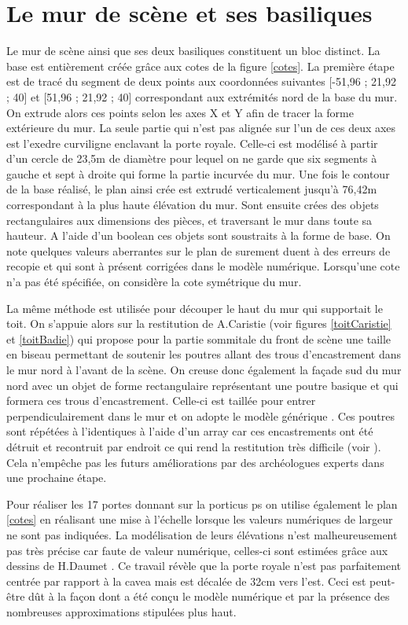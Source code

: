 		\section{Le mur de scène et ses basiliques}

Le mur de scène ainsi que ses deux basiliques constituent un bloc distinct. La base est entièrement créée grâce aux cotes de la figure \ref{cotes}. La première étape est de tracé du segment de deux points aux coordonnées suivantes [-51,96 ; 21,92 ; 40] et [51,96 ; 21,92 ; 40] correspondant aux extrémités nord de la base du mur. On extrude alors ces points selon les axes X et Y afin de tracer la forme extérieure du mur. La seule partie qui n'est pas alignée sur l'un de ces deux axes est l'\gls{exedre} curviligne enclavant la porte royale. Celle-ci est modélisé à partir d'un cercle de 23,5m de diamètre pour lequel on ne garde que six segments à gauche et sept à droite qui forme la partie incurvée du mur. Une fois le contour de la base réalisé, le plan ainsi crée est extrudé verticalement jusqu'à 76,42m correspondant à la plus haute élévation du mur.
Sont ensuite crées des objets rectangulaires aux dimensions des pièces, et traversant le mur dans toute sa hauteur. A l'aide d'un \gls{boolean} ces objets sont soustraits à la forme de base. On note quelques valeurs aberrantes sur le plan de \cite[Pl. XXI]{orangePl} surement duent à des erreurs de recopie et qui sont à présent corrigées dans le modèle numérique. Lorsqu'une cote n'a pas été spécifiée, on considère la cote symétrique du mur. 

La même méthode est utilisée pour découper le haut du mur qui supportait le toit. On s'appuie alors sur la restitution de A.Caristie (voir figures \ref{toitCaristie} et \ref{toitBadie}) qui propose pour la partie sommitale du front de scène une taille en biseau permettant de soutenir les poutres allant des trous d'encastrement dans le mur nord à l'avant de la scène. On creuse donc également la façade sud du mur nord avec un objet de forme rectangulaire représentant une poutre basique et qui formera ces trous d'encastrement. Celle-ci est taillée pour entrer perpendiculairement dans le mur et on adopte le modèle générique \cite[Pl. XL]{orangePl}.
Ces poutres sont répétées à l'identiques à l'aide d'un \gls{array} car ces encastrements ont été détruit et recontruit par endroit ce qui rend la restitution très difficile (voir \cite[Pl. XXXVII]{orangePl}). Cela n'empêche pas les futurs améliorations par des archéologues experts dans une prochaine étape.

Pour réaliser les 17 portes donnant sur la \gls{porticus ps} on utilise également le plan \ref{cotes} en réalisant une mise à l'échelle lorsque les valeurs numériques de largeur ne sont pas indiquées. La modélisation de leurs élévations n'est malheureusement pas très précise car faute de valeur numérique, celles-ci sont estimées grâce aux dessins de H.Daumet \cite[Pl. XII, XIII, XIV]{orangePl}. Ce travail révèle que la porte royale n'est pas parfaitement centrée par rapport à la cavea mais est décalée de 32cm vers l'est. Ceci est peut-être dût à la façon dont a été conçu le modèle numérique et par la présence des nombreuses approximations stipulées plus haut. 

